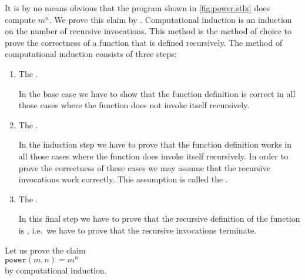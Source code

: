 It is by no means obvious that the program shown in \ref{fig:power.stlx} does compute
$m^n$.  We prove this claim by  .
Computational induction is an induction on the number of recursive invocations.
This method is the method of choice to prove the correctness of a function that is defined recursively.
The method of computational induction consists of three steps:
\begin{enumerate}
\item The .

      In the base case we have to show that the function definition is correct in all those cases where the function
      does not invoke itself recursively.
\item The .

      In the induction step we have to prove that the function definition works in all those cases where
      the function does invoke itself recursively.  In order to prove the correctness of these cases we may
      assume that the recursive invocations work correctly.  This assumption is called the
      .
\item The .

      In this final step we have to prove that the recursive definition of the function is ,
      i.e.~we have to prove that the recursive invocations terminate.
\end{enumerate}
Let us prove the claim 
\\[0.2cm]
\hspace*{1.3cm}
 $\mathtt{power}(m,n) = m^n$
\\[0.2cm] 
by computational induction.
